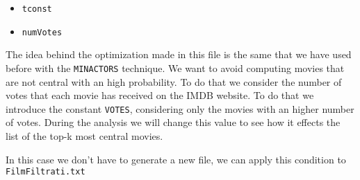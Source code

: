 \begin{itemize}
    \item \texttt{tconst}
    \item \texttt{numVotes}
\end{itemize}

\nd The idea behind the optimization made in this file is the same that we have used before with the \texttt{MIN\textunderscore ACTORS} technique. We want to avoid computing movies that are not central with an high probability. To do that we consider the number of votes that each movie has received on the IMDB website. To do that we introduce the constant \texttt{VOTES}, considering only the movies with an higher number of votes. During the analysis we will change this value to see how it effects the list of the top-k most central movies. \s

\nd In this case we don't have to generate a new file, we can apply this condition to \texttt{FilmFiltrati.txt}
